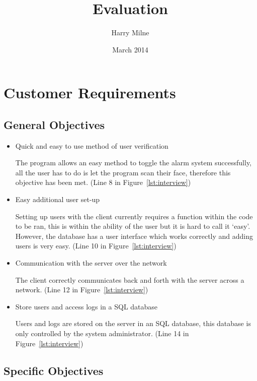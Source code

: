 \documentclass[a4paper]{article}
\title{Evaluation}
\author{Harry Milne}
\date{March 2014}
\begin{document}
\maketitle
\tableofcontents
\newpage
\section{Customer Requirements}
	
	\subsection{General Objectives}
	
		\begin{itemize}
			\item Quick and easy to use method of user verification

			The program allows an easy method to toggle the alarm system successfully, all the user has
			to do is let the program scan their face, therefore this objective has been met. (Line 8 in Figure~\ref{lst:interview})


			\item Easy additional user set-up

			Setting up users with the client currently requires a function within the code to be ran,
			this is within the ability of the user but it is hard to call it `easy'. However, the database
			has a user interface which works correctly and adding users is very easy. (Line 10 in Figure~\ref{lst:interview})

			\item Communication with the server over the network

			The client correctly communicates back and forth with the server across a network. (Line 12 in Figure~\ref{lst:interview})
 
			\item Store users and access logs in a SQL database

			Users and logs are stored on the server in an SQL database, this database is only controlled
			by the system administrator. (Line 14 in Figure~\ref{lst:interview})
		\end{itemize}

	\subsection{Specific Objectives}
\end{document}
